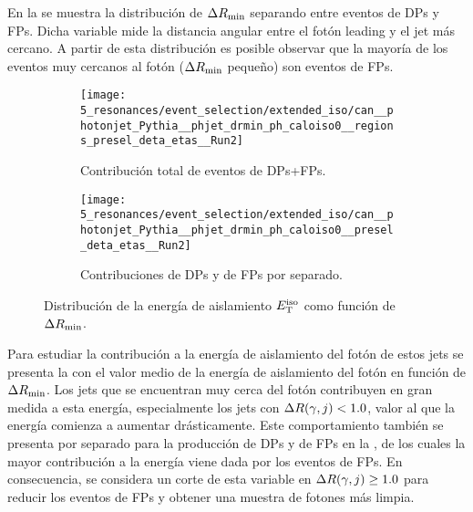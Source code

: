 En la \Fig{\ref{fig:evt_selection:sr_opt:extended_iso:phjet_drmin}} se muestra la distribución de \(\Delta R_{\text{min}}\) separando entre eventos de \acp{DP} y \acp{FP}. Dicha variable mide la distancia angular entre el fotón leading y el jet más cercano. A partir de esta distribución es posible observar que la mayoría de los eventos muy cercanos al fotón (\(\Delta R_{\text{min}}\) pequeño) son eventos de \acp{FP}.


\begin{figure}[ht!]
    \centering
    \begin{subfigure}[t]{0.49\linewidth}
        \centering
        \texttt{[image: 5\_resonances/event\_selection/extended\_iso/can\_\_photonjet\_Pythia\_\_phjet\_drmin\_ph\_caloiso0\_\_regions\_presel\_deta\_etas\_\_Run2]}
        \caption{Contribución total de eventos de \acp{DP}+\acp{FP}.}
        \label{fig:evt_selection:sr_opt:extended_iso:phjet_drmin:etiso:full}
    \end{subfigure}
    \hfill
    \begin{subfigure}[t]{0.49\linewidth}
        \centering
        \texttt{[image: 5\_resonances/event\_selection/extended\_iso/can\_\_photonjet\_Pythia\_\_phjet\_drmin\_ph\_caloiso0\_\_presel\_deta\_etas\_\_Run2]}
        \caption{Contribuciones de \acp{DP} y de \acp{FP} por separado.}
        \label{fig:evt_selection:sr_opt:extended_iso:phjet_drmin:etiso:separated}
    \end{subfigure}
    \caption{Distribución de la energía de aislamiento \(E_{\text{T}}^{\text{iso}}\) como función de \(\Delta R_{\text{min}}\).}
    \label{fig:evt_selection:sr_opt:extended_iso:phjet_drmin:etiso}
\end{figure}

Para estudiar la contribución a la energía de aislamiento del fotón de estos jets se presenta la \Fig{\ref{fig:evt_selection:sr_opt:extended_iso:phjet_drmin:etiso:full}} con el valor medio de la energía de aislamiento del fotón en función de \(\Delta R_{\text{min}}\). Los jets que se encuentran muy cerca del fotón contribuyen en gran medida a esta energía, especialmente los jets con \(\Delta R (\gamma, j) < 1.0\), valor al que la energía comienza a aumentar drásticamente. Este comportamiento también se presenta por separado para la producción de \acp{DP} y de \acp{FP} en la \Fig{\ref{fig:evt_selection:sr_opt:extended_iso:phjet_drmin:etiso:separated}}, de los cuales la mayor contribución a la energía viene dada por los eventos de \acp{FP}.
En consecuencia, se considera un corte de esta variable en \(\Delta R (\gamma, j) \geq 1.0\) para reducir los eventos de \acp{FP} y obtener una muestra de fotones más limpia.






